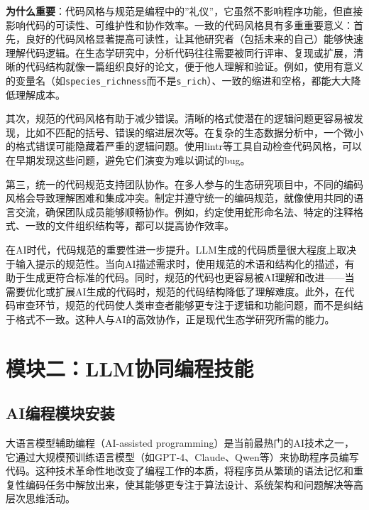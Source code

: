 \documentclass[
]{book}
\begin{document}
\textbf{为什么重要}：代码风格与规范是编程中的''礼仪''，它虽然不影响程序功能，但直接影响代码的可读性、可维护性和协作效率。一致的代码风格具有多重重要意义：首先，良好的代码风格显著提高可读性，让其他研究者（包括未来的自己）能够快速理解代码逻辑。在生态学研究中，分析代码往往需要被同行评审、复现或扩展，清晰的代码结构就像一篇组织良好的论文，便于他人理解和验证。例如，使用有意义的变量名（如\texttt{species\_richness}而不是\texttt{s\_rich}）、一致的缩进和空格，都能大大降低理解成本。

其次，规范的代码风格有助于减少错误。清晰的格式使潜在的逻辑问题更容易被发现，比如不匹配的括号、错误的缩进层次等。在复杂的生态数据分析中，一个微小的格式错误可能隐藏着严重的逻辑问题。使用lintr等工具自动检查代码风格，可以在早期发现这些问题，避免它们演变为难以调试的bug。

第三，统一的代码规范支持团队协作。在多人参与的生态研究项目中，不同的编码风格会导致理解困难和集成冲突。制定并遵守统一的编码规范，就像使用共同的语言交流，确保团队成员能够顺畅协作。例如，约定使用蛇形命名法、特定的注释格式、一致的文件组织结构等，都可以提高协作效率。

在AI时代，代码规范的重要性进一步提升。LLM生成的代码质量很大程度上取决于输入提示的规范性。当向AI描述需求时，使用规范的术语和结构化的描述，有助于生成更符合标准的代码。同时，规范的代码也更容易被AI理解和改进------当需要优化或扩展AI生成的代码时，规范的代码结构降低了理解难度。此外，在代码审查环节，规范的代码使人类审查者能够更专注于逻辑和功能问题，而不是纠结于格式不一致。这种人与AI的高效协作，正是现代生态学研究所需的能力。

\hypertarget{ux6a21ux5757ux4e8cllmux534fux540cux7f16ux7a0bux6280ux80fd}{%
\section{模块二：LLM协同编程技能}\label{ux6a21ux5757ux4e8cllmux534fux540cux7f16ux7a0bux6280ux80fd}}

\hypertarget{aiux7f16ux7a0bux6a21ux5757ux5b89ux88c5}{%
\subsection{AI编程模块安装}\label{aiux7f16ux7a0bux6a21ux5757ux5b89ux88c5}}

大语言模型辅助编程（AI-assisted programming）是当前最热门的AI技术之一，它通过大规模预训练语言模型（如GPT-4、Claude、Qwen等）来协助程序员编写代码。这种技术革命性地改变了编程工作的本质，将程序员从繁琐的语法记忆和重复性编码任务中解放出来，使其能够更专注于算法设计、系统架构和问题解决等高层次思维活动。
\end{document}
